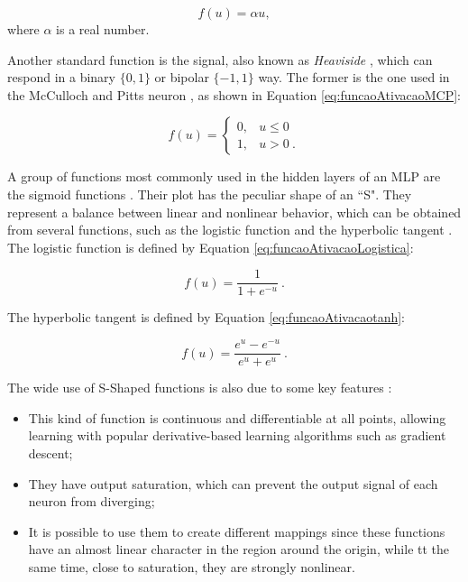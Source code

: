 \begin{equation}
	\label{eq:funcaoAtivacaoLinear}
	f(u) = \alpha u,
\end{equation}
where $\alpha$ is a real number.

Another standard function is the signal, also known as \textit{Heaviside} \cite{haykin}, which can respond in a binary $\{0, 1\}$ or bipolar $\{-1, 1\}$ way. The former is the one used in the McCulloch and Pitts neuron \cite{McCulloch1990}, as shown in Equation \ref{eq:funcaoAtivacaoMCP}:

\begin{equation}
	\label{eq:funcaoAtivacaoMCP}
	f(u) = \left\{\begin{matrix}
		0, & u \leq 0    \\
		1, & u > 0 \: .
	\end{matrix}\right.
\end{equation}

A group of functions most commonly used in the hidden layers of an MLP are the sigmoid functions \cite{haykin, Castro2006FundamentalsON}. Their plot has the peculiar shape of an ``S". They represent a balance between linear and nonlinear behavior, which can be obtained from several functions, such as the logistic function and the hyperbolic tangent \cite{Jeffrey2008}. The logistic function is defined by Equation \ref{eq:funcaoAtivacaoLogistica}:

\begin{equation}
	\label{eq:funcaoAtivacaoLogistica}
	f(u) = \frac{1}{1 + e^{-u}}\:.
\end{equation}

The hyperbolic tangent is defined by Equation \ref{eq:funcaoAtivacaotanh}:

\begin{equation}
\label{eq:funcaoAtivacaotanh}
	f(u) = \frac{e^u - e^{-u}}{e^u + e^{u}}\:.
\end{equation}

The wide use of S-Shaped functions is also due to some key features \cite{Menon1996}:

\begin{itemize}
    \item This kind of function is continuous and differentiable at all points, allowing learning with popular derivative-based learning algorithms such as gradient descent;
    \item They have output saturation, which can prevent the output signal of each neuron from diverging;
    \item It is possible to use them to create different mappings since these functions have an almost linear character in the region around the origin, while tt the same time, close to saturation, they are strongly nonlinear.
\end{itemize}

